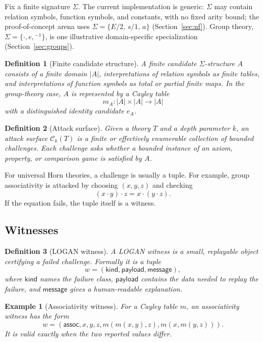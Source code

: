 \documentclass[11pt]{article}
\newtheorem{definition}{Definition}[section]
\newtheorem{example}{Example}[section]
\newcommand{\LOGAN}{\textsc{LOGAN}}
\newcommand{\C}{\mathcal{C}}
\begin{document}
Fix a finite signature \(\Sigma\).  The current implementation is generic: \(\Sigma\) may contain relation symbols, function symbols, and constants, with no fixed arity bound; the proof-of-concept arena uses \(\Sigma=\{E/2,\,s/1,\,a\}\) (Section~\ref{sec:nf}).  Group theory, \(\Sigma=\{\cdot,e,{}^{-1}\}\), is one illustrative domain-specific specialization (Section~\ref{sec:groups}).

\begin{definition}[Finite candidate structure]
A finite candidate \(\Sigma\)-structure \(A\) consists of a finite domain \(|A|\), interpretations of relation symbols as finite tables, and interpretations of function symbols as total or partial finite maps.  In the group-theory case, \(A\) is represented by a Cayley table
\[
  m_A : |A| \times |A| \to |A|
\]
with a distinguished identity candidate \(e_A\).
\end{definition}

\begin{definition}[Attack surface]
Given a theory \(T\) and a depth parameter \(k\), an attack surface \(\C_k(T)\) is a finite or effectively enumerable collection of bounded challenges.  Each challenge asks whether a bounded instance of an axiom, property, or comparison game is satisfied by \(A\).
\end{definition}

For universal Horn theories, a challenge is usually a tuple.  For example, group associativity is attacked by choosing \((x,y,z)\) and checking
\[
  (x\cdot y)\cdot z = x\cdot (y\cdot z).
\]
If the equation fails, the tuple itself is a witness.

\subsection{Witnesses}

\begin{definition}[LOGAN witness]
A \LOGAN{} witness is a small, replayable object certifying a failed challenge.  Formally it is a tuple
\[
  w = (\mathsf{kind}, \mathsf{payload}, \mathsf{message}),
\]
where \(\mathsf{kind}\) names the failure class, \(\mathsf{payload}\) contains the data needed to replay the failure, and \(\mathsf{message}\) gives a human-readable explanation.
\end{definition}

\begin{example}[Associativity witness]
For a Cayley table \(m\), an associativity witness has the form
\[
  w = (\mathsf{assoc}, x,y,z, m(m(x,y),z), m(x,m(y,z))).
\]
It is valid exactly when the two reported values differ.
\end{example}
\end{document}

